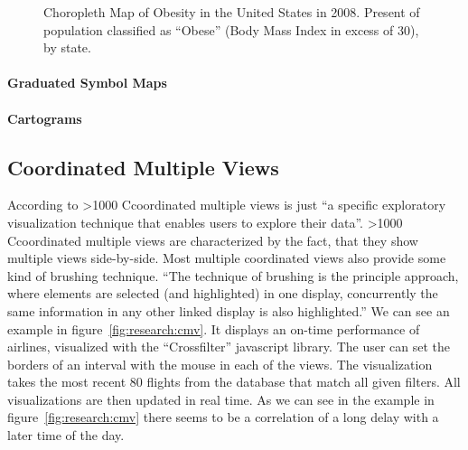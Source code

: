 \documentclass{article}
\newcommand\hmm[1]{\ifnum\ifhmode\spacefactor\else2000\fi>1000 \uppercase{#1}\else#1\fi}
\newcommand{\cmvs}{\hmm{c}oordinated multiple views}
\begin{document}
\begin{figure}[h]
  \centering
  \caption{%
    Choropleth Map of Obesity in the United States in 2008.
    Present of population classified as ``Obese'' (Body Mass Index in excess of 30), by state.
  }\label{fig:theory:choropleth}
\end{figure}

\paragraph{Graduated Symbol Maps}
\paragraph{Cartograms}


\subsection{Coordinated Multiple Views}
According to \textcite{Roberts2007} \cmvs{} is just ``a specific exploratory visualization technique that enables users to explore their data''.
\cmvs{} are characterized by the fact, that they show multiple views side-by-side.
Most multiple coordinated views also provide some kind of brushing technique.
``The technique of brushing is the principle approach, where elements are selected (and highlighted) in one display, concurrently the same information in any other linked display is also highlighted.''\cite{Roberts2007}
We can see an example in figure~\ref{fig:research:cmv}.
It displays an on-time performance of airlines, visualized with the ``Crossfilter'' javascript library.
The user can set the borders of an interval with the mouse in each of the views.
The visualization takes the most recent 80 flights from the database that match all given filters.
All visualizations are then updated in real time.
As we can see in the example in figure~\ref{fig:research:cmv} there seems to be a correlation of a long delay with a later time of the day.
\end{document}
